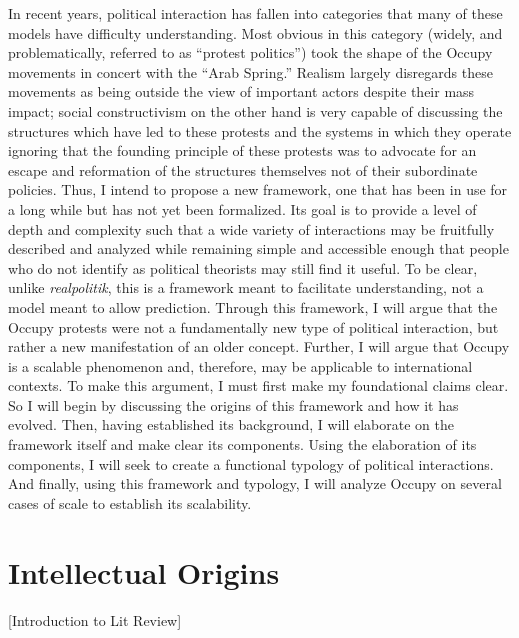 \documentclass{article}
\begin{document}
In recent years, political interaction has fallen into categories that many of these models have difficulty understanding. 
Most obvious in this category (widely, and problematically, referred to as ``protest politics'') took the shape of the Occupy movements in concert with the ``Arab Spring.'' 
Realism largely disregards these movements as being outside the view of important actors despite their mass impact; social constructivism on the other hand is very capable of discussing the structures which have led to these protests and the systems in which they operate ignoring that the founding principle of these protests was to advocate for an escape and reformation of the structures themselves not of their subordinate policies. 
Thus, I intend to propose a new framework, one that has been in use for a long while but has not yet been formalized. 
Its goal is to provide a level of depth and complexity such that a wide variety of interactions may be fruitfully described and analyzed while remaining simple and accessible enough that people who do not identify as political theorists may still find it useful. 
To be clear, unlike \textit{realpolitik}, this is a framework meant to facilitate understanding, not a model meant to allow prediction. 
Through this framework, I will argue that the Occupy protests were not a fundamentally new type of political interaction, but rather a new manifestation of an older concept. 
Further, I will argue that Occupy is a scalable phenomenon and, therefore, may be applicable to international contexts. 
To make this argument, I must first make my foundational claims clear. 
So I will begin by discussing the origins of this framework and how it has evolved. 
Then, having established its background, I will elaborate on the framework itself and make clear its components. 
Using the elaboration of its components, I will seek to create a functional typology of political interactions. 
And finally, using this framework and typology, I will analyze Occupy on several cases of scale to establish its scalability.

\section{Intellectual Origins}
[Introduction to Lit Review]
\end{document}
